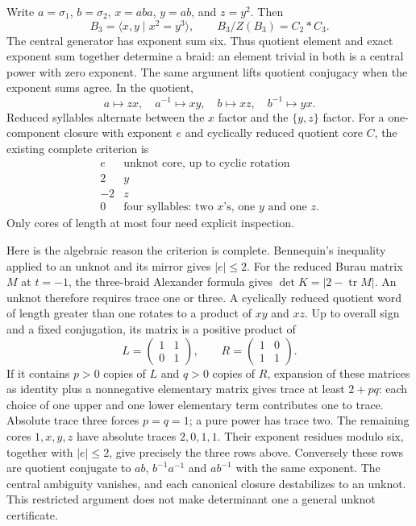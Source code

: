 Write $a=\sigma_1$, $b=\sigma_2$, $x=aba$, $y=ab$, and $z=y^2$.
Then
\[
 B_3=\langle x,y\mid x^2=y^3\rangle,\qquad
 B_3/Z(B_3)=C_2*C_3.
\]
The central generator has exponent sum six. Thus quotient element and exact
exponent sum together determine a braid: an element trivial in both is a
central power with zero exponent. The same argument lifts quotient conjugacy
when the exponent sums agree. In the quotient,
\[
 a\mapsto zx,\quad a^{-1}\mapsto xy,\quad
 b\mapsto xz,\quad b^{-1}\mapsto yx.
\]
Reduced syllables alternate between the $x$ factor and the $\{y,z\}$ factor.
For a one-component closure with exponent $e$ and cyclically reduced quotient
core $C$, the existing complete criterion is
\[
\begin{array}{c|l}
 e & \text{unknot core, up to cyclic rotation}\\\hline
 2 & y\\
 -2 & z\\
 0 & \text{four syllables: two }x\text{'s, one }y\text{ and one }z.
\end{array}
\]
Only cores of length at most four need explicit inspection.

Here is the algebraic reason the criterion is complete. Bennequin's inequality
applied to an unknot and its mirror gives $|e|\le2$. For the reduced Burau
matrix $M$ at $t=-1$, the three-braid Alexander formula gives
$\det K=|2-\operatorname{tr}M|$. An unknot therefore requires trace one or
three. A cyclically reduced quotient word of length greater than one rotates
to a product of $xy$ and $xz$. Up to overall sign and a fixed conjugation,
its matrix is a positive product of
\[
 L=\begin{pmatrix}1&1\\0&1\end{pmatrix},\qquad
 R=\begin{pmatrix}1&0\\1&1\end{pmatrix}.
\]
If it contains $p>0$ copies of $L$ and $q>0$ copies of $R$, expansion of
these matrices as identity plus a nonnegative elementary matrix gives trace
at least $2+pq$: each choice of one upper and one lower elementary term
contributes one to trace. Absolute trace three forces $p=q=1$; a pure
power has trace two. The remaining cores $1,x,y,z$ have absolute traces
$2,0,1,1$. Their exponent residues modulo six, together with $|e|\le2$,
give precisely the three rows above. Conversely these rows are quotient
conjugate to $ab$, $b^{-1}a^{-1}$ and $ab^{-1}$ with the same exponent.
The central ambiguity vanishes, and each canonical closure destabilizes
to an unknot. This restricted argument does not make determinant one a
general unknot certificate.

